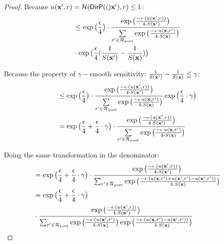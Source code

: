\documentclass{article}
\begin{document}
\begin{proof}
  Because $u(\textbf{x}', {r}) = \mathcal{H}(\mathsf{DirP}(()\textbf{x}'), r) \leq 1$:
  \begin{equation*}
  \begin{split}
  & \leq \exp\big( \frac{\epsilon}{4} \big) \cdot 
  \frac {
  \exp
  \big(
  \frac{-\epsilon\cdot(u(\textbf{x}', {r}))}{4\cdot S(\textbf{x}')}
  \big)
  } 
  {\sum\limits_{r'\in \mathcal{R}_{\textup{post}}} \exp \big(\frac{-\epsilon\cdot u(\textbf{x}, r')}{4 \cdot S(\textbf{x})}\big)}\\
  & \cdot \exp
  \big(
  \frac{\epsilon}{4}(\frac{1}{S(\textbf{x}')} - \frac{1}{S(\textbf{x})})
  \big)\\
  \end{split}
  \end{equation*}

  Because the property of $\gamma -$smooth sensitivity: $\frac{1}{S(\textbf{x}')} - \frac{1}{S(\textbf{x})} \leq \gamma$:  
  \begin{equation*}
  \begin{split}
  & \leq \exp\big( \frac{\epsilon}{4} \big) \cdot 
  \frac {
  \exp
  \big(
  \frac{-\epsilon\cdot(u(\textbf{x}', {r}))}{4\cdot S(\textbf{x}')}
  \big)
  } 
  {\sum\limits_{r'\in \mathcal{R}_{\textup{post}}} \exp \big(\frac{-\epsilon\cdot u(\textbf{x}, r')}{4 \cdot S(\textbf{x})}\big)}
  \exp
  \big(
  \frac{\epsilon}{4} \cdot \gamma
  \big)\\
  & = \exp\big( \frac{\epsilon}{4} + \frac{\epsilon}{4} \cdot \gamma\big) \cdot 
  \frac {
  \exp
  \big(
  \frac{-\epsilon\cdot(u(\textbf{x}', {r}))}{4\cdot S(\textbf{x}')}
  \big)
  } 
  {\sum\limits_{r'\in \mathcal{R}_{\textup{post}}} \exp \big(\frac{-\epsilon\cdot u(\textbf{x}, r')}{4 \cdot S(\textbf{x})}\big)}\\
  \end{split}
  \end{equation*}

  Doing the same transformation in the denominator:
  \begin{equation*}
  \begin{split}
  & = \exp\big( \frac{\epsilon}{4} + \frac{\epsilon}{4} \cdot \gamma\big) \cdot 
  \frac {
  \exp
  \big(
  \frac{-\epsilon\cdot(u(\textbf{x}', {r}))}{4\cdot S(\textbf{x}')}
  \big)
  } 
  {
  \sum_{r'\in \mathcal{R}_{\textup{post}}} 
  \exp 
  \big(
  \frac{-\epsilon\cdot(u(\textbf{x}, {r'}) + u(\textbf{x}', {r'}) - u(\textbf{x}', {r'}))}{4 \cdot S(\textbf{x})}
  \big)
  }\\
  & = \exp\big( \frac{\epsilon}{4} + \frac{\epsilon}{4} \cdot \gamma\big) \\
  & \cdot 
  \frac {
  \exp
  \big(
  \frac{-\epsilon\cdot(u(\textbf{x}', {r}))}{4\cdot S(\textbf{x}')}
  \big)
  } 
  {
  \sum_{r'\in \mathcal{R}_{\textup{post}}} 
  \exp 
  \big(
  \frac{-\epsilon\cdot(u(\textbf{x}', {r'})}{4 \cdot S(\textbf{x})}
  \big)
  \exp 
  \big(
  \frac{-\epsilon\cdot(u(\textbf{x}, {r'}) - u(\textbf{x}', {r'}))}{4 \cdot S(\textbf{x})}
  \big)
  }\\
  \end{split}
  \end{equation*}


\end{proof}
\end{document}
